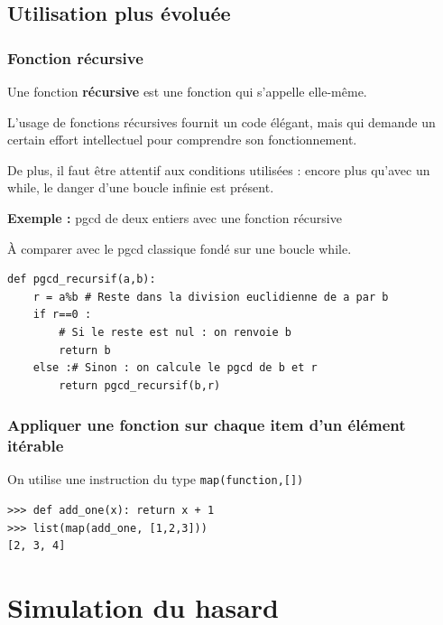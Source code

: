 \subsection{Utilisation plus évoluée}
\subsubsection{Fonction récursive}

Une fonction \textbf{récursive} est une fonction qui s'appelle elle-même.

L'usage de fonctions récursives fournit un code élégant, mais qui demande un certain effort intellectuel
pour comprendre son fonctionnement. 

De plus, il faut être attentif aux conditions utilisées : encore plus
qu'avec un while, le danger d'une boucle infinie est présent.

\medskip

\textbf{\large Exemple :} pgcd de deux entiers avec une fonction récursive

À comparer avec le pgcd classique fondé sur une boucle while.

\begin{lstlisting}
def pgcd_recursif(a,b):
	r = a%b # Reste dans la division euclidienne de a par b
	if r==0 :
		# Si le reste est nul : on renvoie b
		return b
	else :# Sinon : on calcule le pgcd de b et r
		return pgcd_recursif(b,r)
\end{lstlisting}

\subsubsection{Appliquer une fonction sur chaque item d'un élément itérable}

On utilise une instruction du type \verb!map(function,[])!

\begin{lstlisting}
>>> def add_one(x): return x + 1
>>> list(map(add_one, [1,2,3]))
[2, 3, 4]
\end{lstlisting}


\section{Simulation du hasard}

